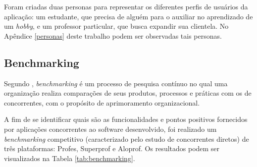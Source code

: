Foram criadas duas personas para representar os diferentes perfis de usuários da aplicação: um estudante, que precisa de alguém para o auxiliar no aprendizado de um \textit{hobby}, e um professor particular, que busca expandir sua clientela. No Apêndice \ref{personas} deste trabalho podem ser observadas tais personas. 

\subsection[Benchmarking]{Benchmarking}

Segundo , \textit{benchmarking} é um processo de pesquisa contínuo no qual uma organização realiza comparações de seus produtos, processos e práticas com os de concorrentes, com o propósito de aprimoramento organizacional.

A fim de se identificar quais são as funcionalidades e pontos positivos fornecidos por aplicações concorrentes ao software desenvolvido, foi realizado um \textit{benchmarking} competitivo (caracterizado pelo estudo de concorrentes diretos) de três plataformas: Profes, Superprof e Aloprof. Os resultados podem ser visualizados na Tabela \ref{tab:benchmarking}.

\newpage

